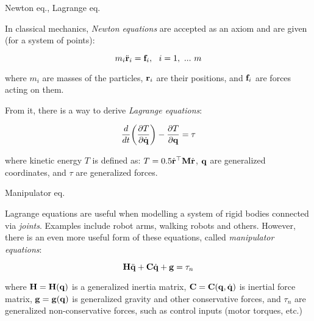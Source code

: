 \documentclass{beamer}
\begin{document}
\begin{frame}{Newton eq., Lagrange eq.}
\begin{flushleft}

In classical mechanics, \emph{Newton equations} are accepted as an axiom and are given (for a system of points):

\begin{equation}
\label{eq:Newton}
    m_i\ddot{\mathbf{r}}_i = \mathbf{f}_i, \ \ i = 1, \ ... \ m  
\end{equation}

where $m_i$ are masses of the particles, $\mathbf{r}_i$ are their positions, and $\mathbf{f}_i$ are forces acting on them.

\bigskip

From it, there is a way to derive \emph{Lagrange equations}:

\begin{equation}
\label{eq:Lagrange}
    \frac{d}{dt} \bigg( 
    \frac{\partial T }{\partial \dot{\mathbf{q}}}
    \bigg) - 
    \frac{\partial T }{\partial \mathbf{q}} = \tau
\end{equation}

where kinetic energy $T$ is defined as: $T = 0.5 \dot{\mathbf{r}} ^\top \mathbf{M} \dot{\mathbf{r}}$, $\mathbf{q}$ are generalized coordinates, and $\tau$ are generalized forces.

\end{flushleft}
\end{frame}




\begin{frame}{Manipulator eq.}
\begin{flushleft}

Lagrange equations are useful when modelling a system of rigid bodies connected via \emph{joints}. Examples include robot arms, walking robots and others. However, there is an even more useful form of these equations, called \emph{manipulator equations}:

\begin{equation}
    \mathbf{H} \ddot{\mathbf{q}} + \mathbf{C} \dot{\mathbf{q}} + \mathbf{g} = \tau_n
\end{equation}

where $\mathbf{H} = \mathbf{H}(\mathbf{q})$ is a generalized inertia matrix, $\mathbf{C} = \mathbf{C}(\mathbf{q}, \dot{\mathbf{q}})$ is inertial force matrix, $\mathbf{g} = \mathbf{g}(\mathbf{q})$ is generalized gravity and other conservative forces, and $\tau_n$ are generalized non-conservative forces, such as control inputs (motor torques, etc.)

\end{flushleft}
\end{frame}
\end{document}
